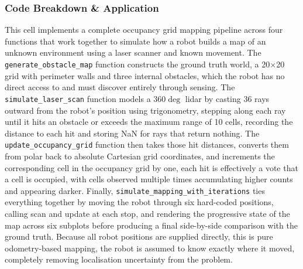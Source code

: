 \documentclass[11 pt , a 4 paper ]{article}
\theoremstyle{definition}
\begin{document}
  \subsubsection*{Code Breakdown \& Application}
   \noindent This cell implements a complete occupancy grid mapping pipeline across four functions that work together to simulate how a robot builds a map of an unknown environment using a laser scanner and known movement. The \texttt{generate\_obstacle\_map} function constructs the ground truth world, a 20×20 grid with perimeter walls and three internal obstacles, which the robot has no direct access to and must discover entirely through sensing. The \texttt{simulate\_laser\_scan} function models a 360$\deg$ lidar by casting 36 rays outward from the robot's position using trigonometry, stepping along each ray until it hits an obstacle or exceeds the maximum range of 10 cells, recording the distance to each hit and storing NaN for rays that return nothing. The \texttt{update\_occupancy\_grid} function then takes those hit distances, converts them from polar back to absolute Cartesian grid coordinates, and increments the corresponding cell in the occupancy grid by one, each hit is effectively a vote that a cell is occupied, with cells observed multiple times accumulating higher counts and appearing darker. Finally, \texttt{simulate\_mapping\_with\_iterations} ties everything together by moving the robot through six hard-coded positions, calling scan and update at each stop, and rendering the progressive state of the map across six subplots before producing a final side-by-side comparison with the ground truth. Because all robot positions are supplied directly, this is pure odometry-based mapping, the robot is assumed to know exactly where it moved, completely removing localisation uncertainty from the problem. \\ 
\end{document}
